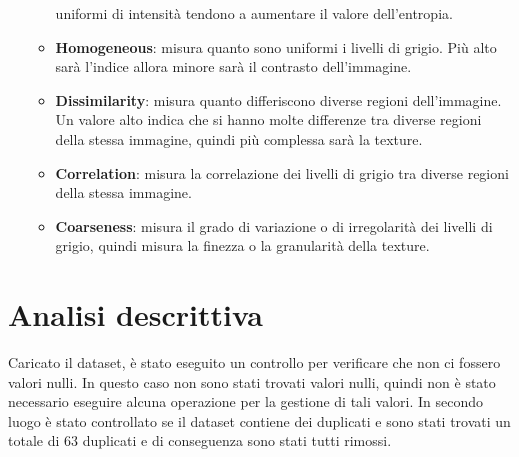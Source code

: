 \begin{enumerate}
\begin{itemize}
                  uniformi di intensità tendono a aumentare il valore dell'entropia.
                  \item \textbf{Homogeneous}: misura quanto sono uniformi i livelli 
                  di grigio. Più alto sarà l'indice allora minore sarà il contrasto 
                  dell'immagine.
                  \item \textbf{Dissimilarity}: misura quanto differiscono diverse 
                  regioni dell'immagine. Un valore alto indica che si hanno molte
                  differenze tra diverse regioni della stessa immagine, quindi più 
                  complessa sarà la texture.
                  \item \textbf{Correlation}: misura la correlazione dei livelli 
                  di grigio tra diverse regioni della stessa immagine. 
                  \item \textbf{Coarseness}: misura il grado di variazione o di 
                  irregolarità dei livelli di grigio, quindi misura la finezza o
                  la granularità della texture.
            \end{itemize}
\end{enumerate}

\section{Analisi descrittiva}\label{sec:analisi-descrittiva}

Caricato il dataset, è stato eseguito un controllo per verificare che non ci fossero
valori nulli. In questo caso non sono stati trovati valori nulli, quindi non è
stato necessario eseguire alcuna operazione per la gestione di tali valori. In
secondo luogo è stato controllato se il dataset contiene dei duplicati e sono stati
trovati un totale di $63$ duplicati e di conseguenza sono stati tutti rimossi.

